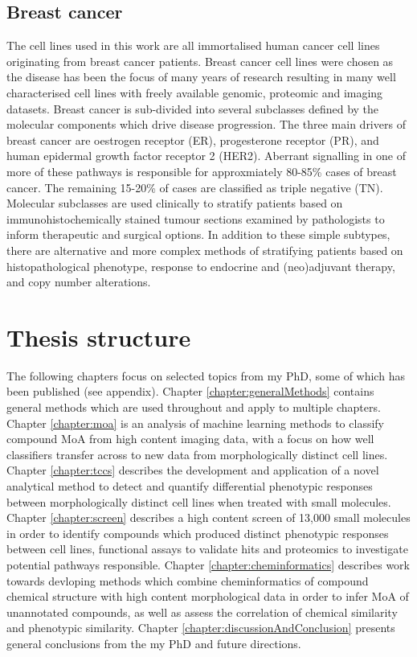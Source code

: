 \documentclass[a4paper,11pt,twoside,openright]{scrbook}
\begin{document}
\subsection{Breast cancer}
The cell lines used in this work are all immortalised human cancer cell lines originating from breast cancer patients.
Breast cancer cell lines were chosen as the disease has been the focus of many years of research resulting in many well characterised cell lines with freely available genomic, proteomic and imaging datasets.
Breast cancer is sub-divided into several subclasses defined by the molecular components which drive disease progression.
The three main drivers of breast cancer are oestrogen receptor (ER), progesterone receptor (PR), and human epidermal growth factor receptor 2 (HER2).
Aberrant signalling in one of more of these pathways is responsible for approxmiately 80-85\% cases of breast cancer.
The remaining 15-20\% of cases are classified as triple negative (TN).
Molecular subclasses are used clinically to stratify patients based on immunohistochemically stained tumour sections examined by pathologists to inform therapeutic and surgical options.
In addition to these simple subtypes, there are alternative and more complex methods of stratifying patients based on histopathological phenotype, response to endocrine and (neo)adjuvant therapy, and copy number alterations. \cite{Sims2007}


\section{Thesis structure}
The following chapters focus on selected topics from my PhD, some of which has been published (see appendix).
Chapter \ref{chapter:generalMethods} contains general methods which are used throughout and apply to multiple chapters.
Chapter \ref{chapter:moa} is an analysis of machine learning methods to classify compound MoA from high content imaging data, with a focus on how well classifiers transfer across to new data from morphologically distinct cell lines.
Chapter \ref{chapter:tccs} describes the development and application of a novel analytical method to detect and quantify differential phenotypic responses between morphologically distinct cell lines when treated with small molecules.
Chapter \ref{chapter:screen} describes a high content screen of 13,000 small molecules in order to identify compounds which produced distinct phenotypic responses between cell lines, functional assays to validate hits and proteomics to investigate potential pathways responsible.
Chapter \ref{chapter:cheminformatics} describes work towards devloping methods which combine cheminformatics of compound chemical structure with high content morphological data in order to infer MoA of unannotated compounds, as well as assess the correlation of chemical similarity and phenotypic similarity.
Chapter \ref{chapter:discussionAndConclusion} presents general conclusions from the my PhD and future directions.

\end{document}
